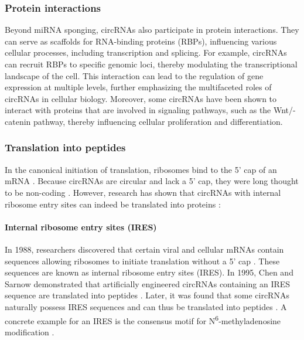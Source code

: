 \subsubsection{Protein interactions}
Beyond miRNA sponging, circRNAs also participate in protein interactions.
They can serve as scaffolds for RNA-binding proteins (RBPs), influencing
various cellular processes, including transcription and
splicing\supercite{li_comprehensive_2017,qu_emerging_2017}.
For example, circRNAs can recruit RBPs to specific genomic loci, thereby
modulating the transcriptional landscape of the
cell\supercite{li_comprehensive_2017}.
This interaction can lead to the regulation of gene expression at multiple
levels, further emphasizing the multifaceted roles of circRNAs in cellular
biology\supercite{zhang_important_2024,he_targeting_2021}.
Moreover, some circRNAs have been shown to interact with proteins that are
involved in signaling pathways, such as the Wnt/\textbeta{}-catenin pathway,
thereby influencing cellular proliferation and
differentiation\supercite{peng_novel_2021}.

\subsubsection{Translation into peptides}
In the canonical initiation of translation, ribosomes bind to the 5' cap of an
mRNA \supercite{hinnebusch_mechanism_2012}.
Because circRNAs are circular and lack a 5' cap, they were long thought to be
non-coding \supercite{bao_regulatory_2019,greene_circular_2017}.
However, research has shown that circRNAs with internal ribosome entry sites
can indeed be translated into proteins \supercite{chen_expanding_2020}:

\paragraph{Internal ribosome entry sites (IRES)} In 1988, researchers
discovered that certain viral and cellular mRNAs contain sequences allowing
ribosomes to initiate translation without a 5' cap
\supercite{pelletier_internal_1988, jang_segment_1988}.
These sequences are known as internal ribosome entry sites (IRES).
In 1995, Chen and Sarnow demonstrated that artificially engineered circRNAs
containing an IRES sequence are translated into peptides
\supercite{chen_initiation_1995}.
Later, it was found that some circRNAs naturally possess IRES sequences and can
thus be translated into peptides
\supercite{chen_expanding_2020,legnini_circ-znf609_2017,pamudurti_translation_2017}.
A concrete example for an IRES is the consensus motif for
N\textsuperscript{6}-methyladenosine modification
\supercite{yang_extensive_2017}.

